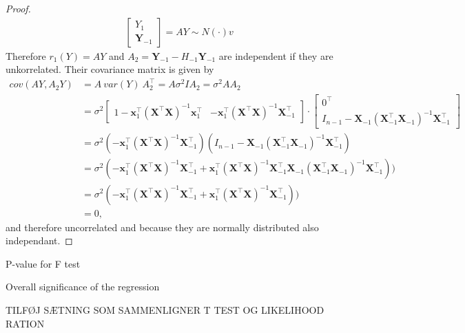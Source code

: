 \begin{proof}
\begin{align*}
\begin{bmatrix}
            Y_1 \\
            \textbf{Y}_{-1}
        \end{bmatrix}
        =
        AY \sim N(\cdot)v 
    \end{align*}
    Therefore $r_1(Y) = AY$ and $A_2 = \textbf{Y}_{-1} - H_{-1} \textbf{Y}_{-1}$ are independent if they are unkorrelated. Their covariance matrix is given by 
    \begin{align*}
        cov(A Y, A_2 Y) &= A\  var(Y) \ A_2^\top = A \sigma^2 I A_2 = \sigma^2 A A_2 \\
        &= \sigma^2 
        \begin{bmatrix}
            1 - \textbf{x}_1^\top (\textbf{X}^\top \textbf{X})^{-1} \textbf{x}_1^\top & - \textbf{x}_1^\top (\textbf{X}^\top \textbf{X})^{-1} \textbf{X}_{-1}^\top
        \end{bmatrix}
        \cdot
        \begin{bmatrix}
            0^\top \\
            I_{n-1} - \textbf{X}_{-1} (\textbf{X}_{-1}^\top \textbf{X}_{-1})^{-1} \textbf{X}_{-1}^\top
        \end{bmatrix} \\
        &= \sigma^2 (- \textbf{x}_1^\top (\textbf{X}^\top \textbf{X})^{-1} \textbf{X}_{-1}^\top) (I_{n-1} - \textbf{X}_{-1} (\textbf{X}_{-1}^\top \textbf{X}_{-1})^{-1} \textbf{X}_{-1}^\top) \\
        &= \sigma^2 (- \textbf{x}_1^\top (\textbf{X}^\top \textbf{X})^{-1} \textbf{X}_{-1}^\top + \textbf{x}_1^\top (\textbf{X}^\top \textbf{X})^{-1} \textbf{X}_{-1}^\top \textbf{X}_{-1} (\textbf{X}_{-1}^\top \textbf{X}_{-1})^{-1} \textbf{X}_{-1}^\top)) \\
        &= \sigma^2 (- \textbf{x}_1^\top (\textbf{X}^\top \textbf{X})^{-1} \textbf{X}_{-1}^\top + \textbf{x}_1^\top (\textbf{X}^\top \textbf{X})^{-1} \textbf{X}_{-1}^\top)) \\
        &= 0,
    \end{align*}
    and therefore uncorrelated and because they are normally distributed also independant.
\end{proof}

P-value for F test

Overall significance of the regression

TILFØJ SÆTNING SOM SAMMENLIGNER T TEST OG LIKELIHOOD RATION





